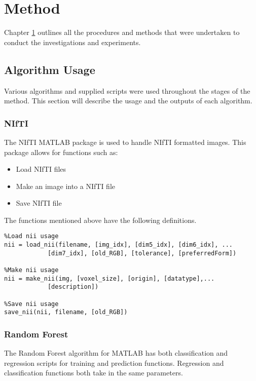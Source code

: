 \chapter{Method}
\label{chpt: method}

Chapter \ref{chpt: method} outlines all the procedures and methods that were undertaken to conduct the investigations and experiments. 

\section{Algorithm Usage}
Various algorithms and supplied scripts were used throughout the stages of the method. This section will describe the usage and the outputs of each algorithm.
\subsection{NIfTI} 
\label{sect:nifti}
The NIfTI MATLAB package is used to handle NIfTI formatted images. This package allows for functions such as:
\begin{itemize}
	\item Load NIfTI files
	\item Make an image into a NIfTI file
	\item Save NIfTI file
\end{itemize}

The functions mentioned above have the following definitions.
\begin{lstlisting}
%Load nii usage
nii = load_nii(filename, [img_idx], [dim5_idx], [dim6_idx], ...
			[dim7_idx], [old_RGB], [tolerance], [preferredForm])
			
%Make nii usage
nii = make_nii(img, [voxel_size], [origin], [datatype],...
 			[description])

%Save nii usage
save_nii(nii, filename, [old_RGB])
\end{lstlisting}

\subsection{Random Forest} 
The Random Forest algorithm for MATLAB has both classification and regression scripts for training and prediction functions. Regression and classification functions both take in the same parameters. 
